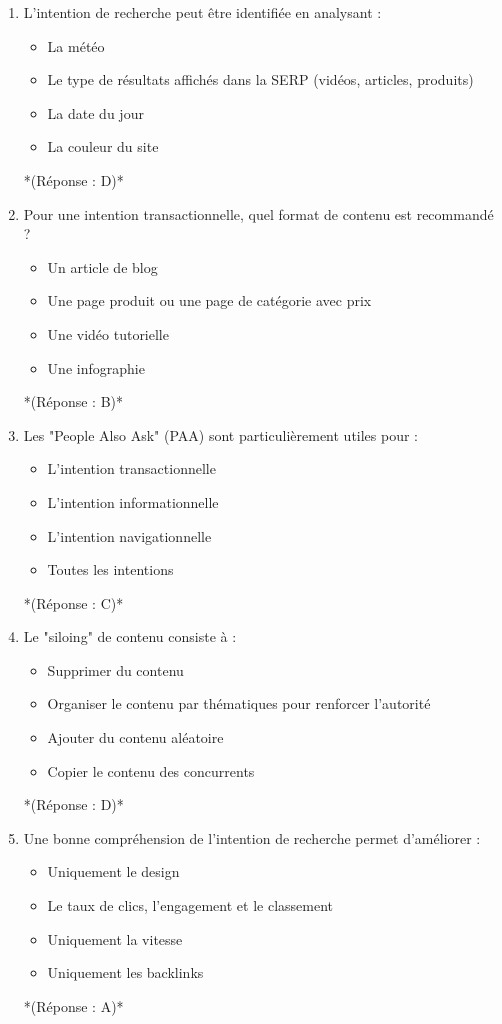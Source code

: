 \documentclass[12pt,a4paper,twoside]{report}
\begin{document}
\begin{enumerate}
\item L'intention de recherche peut être identifiée en analysant :
\begin{itemize}
\item[A)] La météo
\item[B)] Le type de résultats affichés dans la SERP (vidéos, articles, produits)
\item[C)] La date du jour
\item[D)] La couleur du site
\end{itemize}
*(Réponse : D)*

\item Pour une intention transactionnelle, quel format de contenu est recommandé ?
\begin{itemize}
\item[A)] Un article de blog
\item[B)] Une page produit ou une page de catégorie avec prix
\item[C)] Une vidéo tutorielle
\item[D)] Une infographie
\end{itemize}
*(Réponse : B)*

\item Les "People Also Ask" (PAA) sont particulièrement utiles pour :
\begin{itemize}
\item[A)] L'intention transactionnelle
\item[B)] L'intention informationnelle
\item[C)] L'intention navigationnelle
\item[D)] Toutes les intentions
\end{itemize}
*(Réponse : C)*

\item Le "siloing" de contenu consiste à :
\begin{itemize}
\item[A)] Supprimer du contenu
\item[B)] Organiser le contenu par thématiques pour renforcer l'autorité
\item[C)] Ajouter du contenu aléatoire
\item[D)] Copier le contenu des concurrents
\end{itemize}
*(Réponse : D)*

\item Une bonne compréhension de l'intention de recherche permet d'améliorer :
\begin{itemize}
\item[A)] Uniquement le design
\item[B)] Le taux de clics, l'engagement et le classement
\item[C)] Uniquement la vitesse
\item[D)] Uniquement les backlinks
\end{itemize}
*(Réponse : A)*


\end{enumerate}
\end{document}
